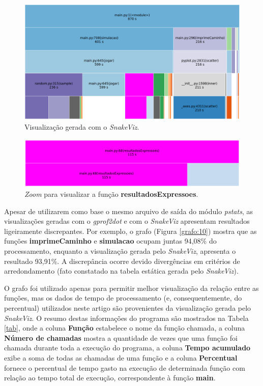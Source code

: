 \documentclass[12pt]{article}
\begin{document}
\begin{figure}[ht]
	\centering
	\includegraphics[width=0.9\linewidth]{img/view_snakeviz_1.png}
	\caption{Visualização gerada com o \textit{SnakeViz}.}
	\label{viewSnakeViz}
\end{figure}

\begin{figure}[ht]
	\centering
	\includegraphics[width=0.9\linewidth]{img/viewSnakeVizZoom.png}
	\caption{\textit{Zoom} para visualizar a função \textbf{resultadosExpressoes}.}
	\label{viewSnakeVizZoom}
\end{figure}

Apesar de  utilizarem como base o mesmo arquivo de saída do módulo \textit{pstats}, as visualizações geradas com o \textit{gprof2dot} e com o \textit{SnakeViz} apresentam resultados ligeiramente discrepantes. Por exemplo, o grafo (Figura \ref{grafo:10}) mostra que as funções \textbf{imprimeCaminho} e \textbf{simulacao} ocupam juntas 94,08\% do processamento, enquanto a visualização gerada pelo \textit{SnakeViz}, apresenta o resultado 93,91\%. A discrepância ocorre devido divergências em critérios de arredondamento (fato constatado na tabela estática gerada pelo \textit{SnakeViz}).

O grafo foi utilizado apenas para permitir melhor visualização da relação entre as funções, mas os dados de tempo de processamento (e, consequentemente, do percentual) utilizados neste artigo são provenientes da visualização gerada pelo \textit{SnakeViz}. O resumo destas informações do programa são mostrados na Tabela \ref{tab}, onde a coluna \textbf{Função} estabelece o nome da função chamada, a coluna \textbf{Número de chamadas} mostra a quantidade de vezes que uma função foi chamada durante toda a execução do programa, a coluna \textbf{Tempo acumulado} exibe a soma de todas as chamadas de uma função e a coluna \textbf{Percentual} fornece o percentual de tempo gasto na execução de determinada função com relação ao tempo total de execução, correspondente à função \textbf{main}.
\end{document}

